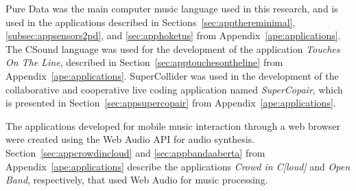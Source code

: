 Pure Data was the main computer music language used in this research, and is used in the applications described in Sections~\ref{sec:appthereminimal}, \ref{subsec:appsensors2pd}, and \ref{sec:apphoketus} from Appendix~\ref{ape:applications}.
The CSound language was used for the development of the application \textit{Touches On The Line}, described in Section~\ref{sec:apptouchesontheline} from Appendix~\ref{ape:applications}.
SuperCollider was used in the development of the collaborative and cooperative live coding application named \textit{SuperCopair}, which is presented in Section~\ref{sec:appsupercopair} from Appendix~\ref{ape:applications}.

The applications developed for mobile music interaction through a web browser were created using the Web Audio API for audio synthesis.
Section~\ref{sec:appcrowdincloud} and \ref{sec:appbandaaberta} from Appendix~\ref{ape:applications} describe the applications \textit{Crowd in C[loud]} and \textit{Open Band}, respectively, that used Web Audio for music processing.

